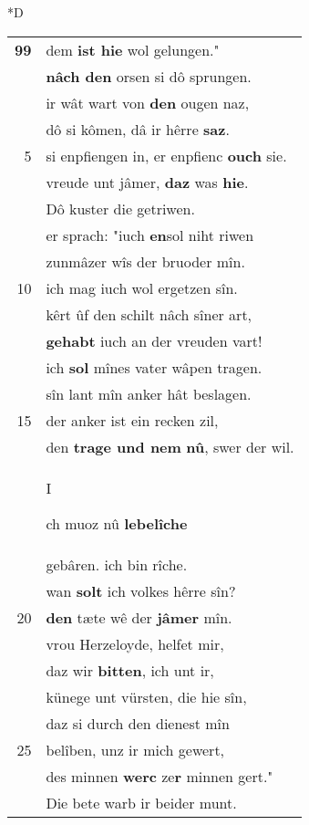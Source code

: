 \documentclass[8pt,a4paper,notitlepage]{article}
\begin{document}
\begin{table}[ht]
\begin{minipage}[t]{0.5\linewidth}
\small
\begin{center}*D
\end{center}
\begin{tabular}{rl}
\textbf{99} & dem \textbf{ist hie} wol gelungen."\\ 
 & \textbf{nâch den} orsen si dô sprungen.\\ 
 & ir wât wart von \textbf{den} ougen naz,\\ 
 & dô si kômen, dâ ir hêrre \textbf{saz}.\\ 
5 & si enpfiengen in, er enpfienc \textbf{ouch} sie.\\ 
 & vreude unt jâmer, \textbf{daz} was \textbf{hie}.\\ 
 & Dô kuster die getriwen.\\ 
 & er sprach: "iuch \textbf{en}sol niht riwen\\ 
 & zunmâzer wîs der bruoder mîn.\\ 
10 & ich mag iuch wol ergetzen sîn.\\ 
 & kêrt ûf den schilt nâch sîner art,\\ 
 & \textbf{gehabt} iuch an der vreuden vart!\\ 
 & ich \textbf{sol} mînes vater wâpen tragen.\\ 
 & sîn lant mîn anker hât beslagen.\\ 
15 & der anker ist ein recken zil,\\ 
 & den \textbf{trage und nem} \textbf{nû}, swer der wil.\\ 
 & \begin{large}I\end{large}ch muoz nû \textbf{lebelîche}\\ 
 & gebâren. ich bin rîche.\\ 
 & wan \textbf{solt} ich volkes hêrre sîn?\\ 
20 & \textbf{den} tæte wê der \textbf{jâmer} mîn.\\ 
 & vrou Herzeloyde, helfet mir,\\ 
 & daz wir \textbf{bitten}, ich unt ir,\\ 
 & künege unt vürsten, die hie sîn,\\ 
 & daz si durch den dienest mîn\\ 
25 & belîben, unz ir mich gewert,\\ 
 & des minnen \textbf{werc} ze\textbf{r} minnen gert."\\ 
 & Die bete warb ir beider munt.\\ 

\end{tabular}
\end{minipage}
\end{table}
\end{document}
